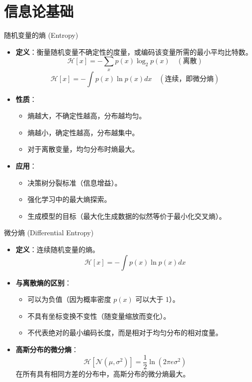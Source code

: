 \documentclass[12pt, aspectratio=169]{beamer}
\newcommand{\N}{\mathcal{N}}
\newcommand{\mcH}{\mathcal{H}}
\begin{document}
\section{信息论基础}

\begin{frame}{随机变量的熵 (Entropy)}
    \begin{itemize}
        \item \textbf{定义}：衡量随机变量不确定性的度量，或编码该变量所需的最小平均比特数。
        $$ \mcH[x] = -\sum_x p(x) \log_2 p(x) \quad (\text{离散}) $$
        $$ \mcH[x] = -\int p(x) \ln p(x) dx \quad (\text{连续，即微分熵}) $$
        \item \textbf{性质}：
        \begin{itemize}
            \item 熵越大，不确定性越高，分布越均匀。
            \item 熵越小，确定性越高，分布越集中。
            \item 对于离散变量，均匀分布时熵最大。
        \end{itemize}
        \item \textbf{应用}：
        \begin{itemize}
            \item 决策树分裂标准（信息增益）。
            \item 强化学习中的最大熵探索。
            \item 生成模型的目标（最大化生成数据的似然等价于最小化交叉熵）。
        \end{itemize}
    \end{itemize}
\end{frame}

\begin{frame}{微分熵 (Differential Entropy)}
    \begin{itemize}
        \item \textbf{定义}：连续随机变量的熵。
        $$ \mcH[x] = -\int p(x) \ln p(x) dx $$
        \item \textbf{与离散熵的区别}：
        \begin{itemize}
            \item 可以为负值（因为概率密度 $p(x)$ 可以大于 1）。
            \item 不具有坐标变换不变性（随变量缩放而变化）。
            \item 不代表绝对的最小编码长度，而是相对于均匀分布的相对度量。
        \end{itemize}
        \item \textbf{高斯分布的微分熵}：
        $$ \mcH[\N(\mu, \sigma^2)] = \frac{1}{2} \ln(2\pi e \sigma^2) $$
        在所有具有相同方差的分布中，高斯分布的微分熵最大。
    \end{itemize}
\end{frame}
\end{document}
